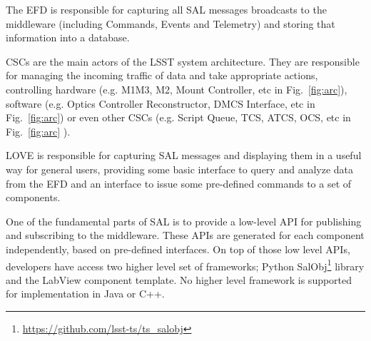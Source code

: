 The EFD is responsible for capturing all SAL messages broadcasts to the middleware (including Commands, Events and Telemetry) and storing that information into a database.

CSCs are the main actors of the LSST system architecture. They are responsible for managing the incoming traffic of data and take appropriate actions, controlling hardware (e.g. M1M3, M2, Mount Controller, etc in Fig.~\ref{fig:arc}), software (e.g. Optics Controller Reconstructor, DMCS Interface, etc in Fig.~\ref{fig:arc}) or even other CSCs (e.g. Script Queue, TCS, ATCS, OCS, etc in Fig.~\ref{fig:arc} ).

LOVE is responsible for capturing SAL messages and displaying them in a useful way for general users, providing some basic interface to query and analyze data from the EFD and an interface to issue some pre-defined commands to a set of components.

One of the fundamental parts of SAL is to provide a low-level API for publishing and subscribing to the middleware. These APIs are generated for each component independently, based on pre-defined interfaces. On top of those low level APIs, developers have access two higher level set of frameworks; Python SalObj\footnote{\url{https://github.com/lsst-ts/ts_salobj}} library and the LabView component template. No higher level framework is supported for implementation in Java or C++.




